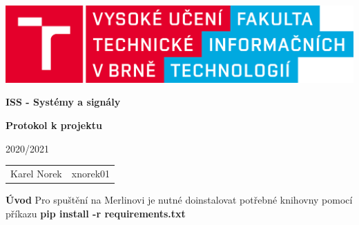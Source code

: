 \documentclass[a4paper]{article}
\begin{document}
    \begin{titlepage}
        \begin{center}
            
            \includegraphics[scale=0.1,keepaspectratio]{fig/logo_cz.png}
            
            \vspace{3cm}
           
            {\textbf{\Huge ISS - Systémy a signály}}
            
            \vspace{1cm}
            
            {\textbf{\LARGE Protokol k projektu}}
            
            \vspace{0.25cm}
            
            {\LARGE 2020/2021}
            
            \vspace{2cm}
            
            \Large
            \begin{tabular}{l l}
    				Karel Norek & xnorek01
    		\end{tabular}
            
            \vfill
        \end{center}
    
    \end{titlepage}
    \large
    \setcounter{page}{1}
    \textbf{Úvod}
    \newline
    Pro spuštění na Merlinovi je nutné doinstalovat potřebné knihovny pomocí příkazu \textbf{pip install -r requirements.txt}
\end{document}
